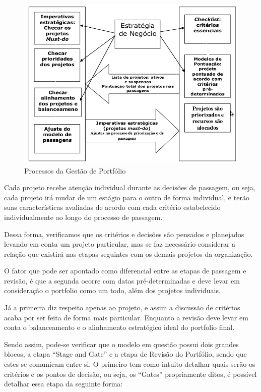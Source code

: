 \documentclass[12pt,a4paper,ruledheader,tocpage=prefix,floatnumber=continuous,pagestart=folhaderosto,font=times]{abnt}
\begin{document}
\begin{figure}[H]
\centering
\includegraphics[width=.9\textwidth]{gpp_total_cooper.png}
\caption{Processos da Gestão de Portfólio\cite{cooper}}
\end{figure}

Cada projeto recebe atenção individual durante as decisões de passagem, ou seja, cada projeto irá mudar de um estágio para o outro de forma individual,
e terão suas características avaliadas de acordo com cada critério estabelecido individualmente ao longo do processo de passagem. 

Dessa forma, verificamos que os critérios e decisões são pensados e planejados levando em conta um projeto particular, mas se faz necessário considerar
a relação que existirá nas etapas seguintes com os demais projetos da organização.

O fator que pode ser apontado como diferencial entre as etapas de passagem e revisão, é que a segunda ocorre com datas pré-determinadas e deve levar em 
consideração o portfolio como um todo, além dos projetos individuais. 

Já a primeira diz respeito apenas ao projeto, e assim a discussão de critérios acaba por ser feita de forma mais particular. Enquanto a revisão deve 
levar em conta o balanceamento e o alinhamento estratégico ideal do portfolio final.

Sendo assim, pode-se verificar que o modelo em questão possui dois grandes blocos, a etapa ``Stage and Gate'' e a etapa de Revisão do Portfólio, sendo que
estes se comunicam entre si. O primeiro tem como intuito detalhar quais serão os critérios e os pontos de decisão, ou seja, os ``Gates'' propriamente ditos,
é possível detalhar essa etapa da seguinte forma:
\end{document}
